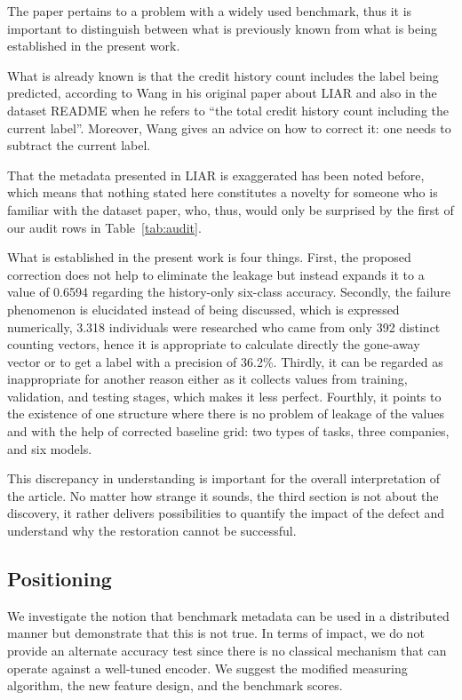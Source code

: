 \documentclass[10pt,twocolumn,twoside,a4paper]{article}
\begin{document}
The paper pertains to a problem with a widely used benchmark, thus it is important to distinguish between what is previously known from what is being established in the present work.

What is already known is that the credit history count includes the label being predicted, according to Wang \cite{wang2017liar} in his original paper about LIAR and also in the dataset README when he refers to ``the total credit history count including the current label''. Moreover, Wang gives an advice on how to correct it: one needs to subtract the current label.

That the metadata presented in LIAR is exaggerated has been noted before, which means that nothing stated here constitutes a novelty for someone who is familiar with the dataset paper, who, thus, would only be surprised by the first of our audit rows in Table~\ref{tab:audit}.

What is established in the present work is four things. First, the proposed correction does not help to eliminate the leakage but instead expands it to a value of 0.6594 regarding the history-only six-class accuracy. Secondly, the failure phenomenon is elucidated instead of being discussed, which is expressed numerically, 3.318 individuals were researched who came from only 392 distinct counting vectors, hence it is appropriate to calculate directly the gone-away vector or to get a label with a precision of 36.2\%. Thirdly, it can be regarded as inappropriate for another reason either as it collects values from training, validation, and testing stages, which makes it less perfect. Fourthly, it points to the existence of one structure where there is no problem of leakage of the values and with the help of corrected baseline grid: two types of tasks, three companies, and six models.

This discrepancy in understanding is important for the overall interpretation of the article. No matter how strange it sounds, the third section is not about the discovery, it rather delivers possibilities to quantify the impact of the defect and understand why the restoration cannot be successful.

\subsection{Positioning}

We investigate the notion that benchmark metadata can be used in a distributed manner but demonstrate that this is not true. In terms of impact, we do not provide an alternate accuracy test since there is no classical mechanism that can operate against a well-tuned encoder. We suggest the modified measuring algorithm, the new feature design, and the benchmark scores.
\end{document}
